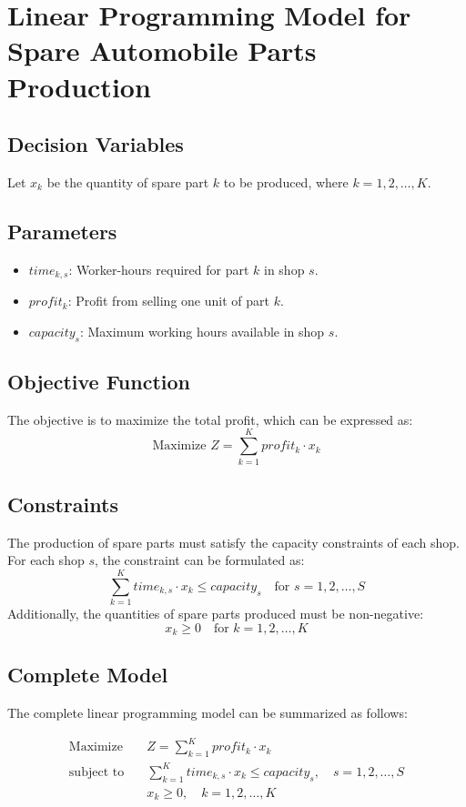 \documentclass{article}
\begin{document}
\section*{Linear Programming Model for Spare Automobile Parts Production}

\subsection*{Decision Variables}
Let \( x_k \) be the quantity of spare part \( k \) to be produced, where \( k = 1, 2, \ldots, K \).

\subsection*{Parameters}
\begin{itemize}
    \item \( time_{k,s} \): Worker-hours required for part \( k \) in shop \( s \).
    \item \( profit_k \): Profit from selling one unit of part \( k \).
    \item \( capacity_s \): Maximum working hours available in shop \( s \).
\end{itemize}

\subsection*{Objective Function}
The objective is to maximize the total profit, which can be expressed as:
\[
\text{Maximize } Z = \sum_{k=1}^{K} profit_k \cdot x_k
\]

\subsection*{Constraints}
The production of spare parts must satisfy the capacity constraints of each shop. For each shop \( s \), the constraint can be formulated as:
\[
\sum_{k=1}^{K} time_{k,s} \cdot x_k \leq capacity_s \quad \text{for } s = 1, 2, \ldots, S
\]
Additionally, the quantities of spare parts produced must be non-negative:
\[
x_k \geq 0 \quad \text{for } k = 1, 2, \ldots, K
\]

\subsection*{Complete Model}
The complete linear programming model can be summarized as follows:

\begin{align*}
\text{Maximize} \quad & Z = \sum_{k=1}^{K} profit_k \cdot x_k \\
\text{subject to} \quad & \sum_{k=1}^{K} time_{k,s} \cdot x_k \leq capacity_s, \quad s = 1, 2, \ldots, S \\
& x_k \geq 0, \quad k = 1, 2, \ldots, K
\end{align*}
\end{document}
